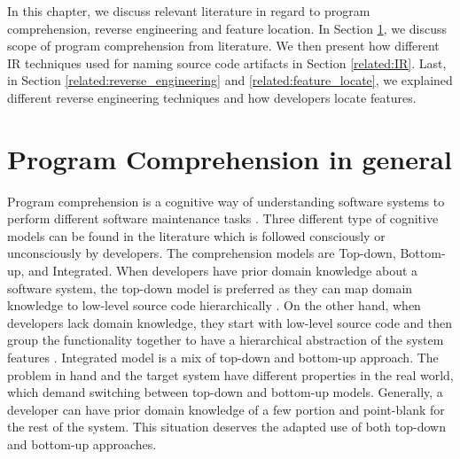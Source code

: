 In this chapter, we discuss relevant literature in regard to program comprehension, reverse engineering and feature location. In Section \ref{related:program_comprehension}, we discuss scope of program comprehension from literature. We then present how different IR techniques used for naming source code artifacts in Section \ref{related:IR}. Last, in Section \ref{related:reverse_engineering} and \ref{related:feature_locate}, we explained different reverse engineering techniques and how developers locate features.


\section{Program Comprehension in general}
\label{related:program_comprehension}
Program comprehension is a cognitive way of understanding software systems to perform different software maintenance tasks \cite{wei2002surveyCategorizationComprehension, siegmund2016programPastFuture}. Three different type of cognitive models \cite{tilley1998reverseEngineeringFramework, von1993programToolRequirements, siegmund2016programPastFuture} can be found in the literature which is followed consciously or unconsciously by developers. The comprehension models are Top-down, Bottom-up, and Integrated. When developers have prior domain knowledge about a software system, the top-down model is preferred as they can map domain knowledge to low-level source code hierarchically \cite{brooks1983theoryComprehensionPrograms}. On the other hand, when developers lack domain knowledge, they start with low-level source code and then group the functionality together to have a hierarchical abstraction of the system features \cite{shneiderman1979syntacticInteractionsModel, pennington1987stimulusMentalRepresentations}. Integrated model \cite{shaft1995relevanceDomainKnowledge, von1993programToolRequirements} is a mix of top-down and bottom-up approach. The problem in hand and the target system have different properties in the real world, which demand switching between top-down and bottom-up models. Generally, a developer can have prior domain knowledge of a few portion and point-blank for the rest of the system. This situation deserves the adapted use of both top-down and bottom-up approaches.   



